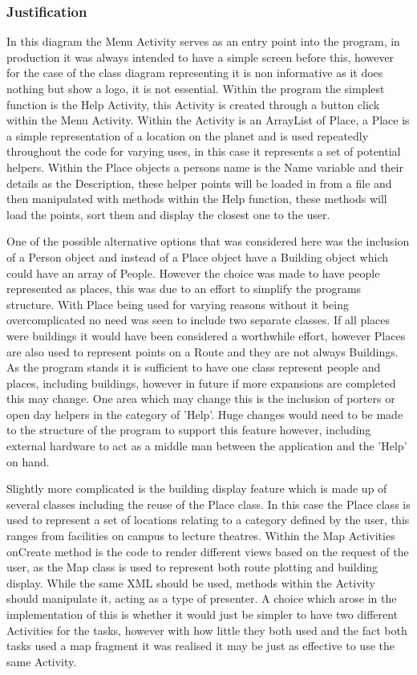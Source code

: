 \subsubsection{Justification}
In this diagram the Menu Activity serves as an entry point into the program, in production it was always intended to have a simple screen before this, however for the case of the class diagram representing it is non informative as it does nothing but show a logo, it is not essential. Within the program the simplest function is the Help Activity, this Activity is created through a button click within the Menu Activity. Within the Activity is an ArrayList of Place, a Place is a simple representation of a location on the planet and is used repeatedly throughout the code for varying uses, in this case it represents a set of potential helpers. Within the Place objects a persons name is the Name variable and their details as the Description, these helper points will be loaded in from a file and then manipulated with methods within the Help function, these methods will load the points, sort them and display the closest one to the user. 

One of the possible alternative options that was considered here was the inclusion of a Person object and instead of a Place object have a Building object which could have an array of People. However the choice was made to have people represented as places, this was due to an effort to simplify the programs structure. With Place being used for varying reasons without it being overcomplicated no need was seen to include two separate classes. If all places were buildings it would have been considered a worthwhile effort, however Places are also used to represent points on a Route and they are not always Buildings. As the program stands it is sufficient to have one class represent people and places, including buildings, however in future if more expansions are completed this may change. One area which may change this is the inclusion of porters or open day helpers in the category of 'Help'. Huge changes would need to be made to the structure of the program to support this feature however, including external hardware to act as a middle man between the application and the 'Help' on hand. 

Slightly more complicated is the building display feature which is made up of several classes including the reuse of the Place class. In this case the Place class is used to represent a set of locations relating to a category defined by the user, this ranges from facilities on campus to lecture theatres. Within the Map Activities onCreate method is the code to render different views based on the request of the user, as the Map class is used to represent both route plotting and building display. While the same XML should be used, methods within the Activity should manipulate it, acting as a type of presenter. A choice which arose in the implementation of this is whether it would just be simpler to have two different Activities for the tasks, however with how little they both used and the fact both tasks used a map fragment it was realised it may be just as effective to use the same Activity. 

